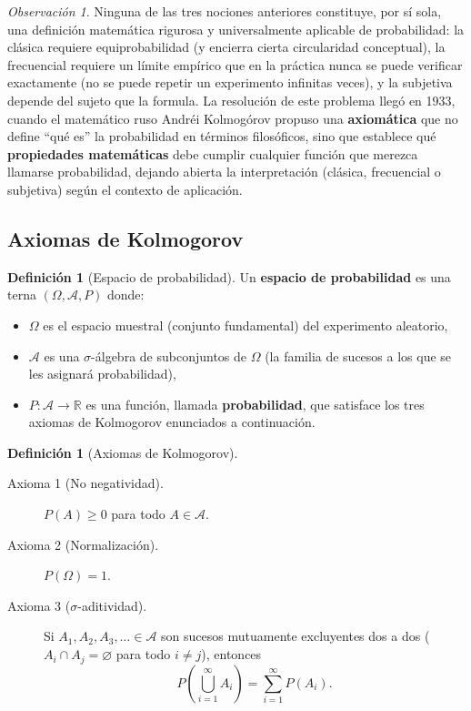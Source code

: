 \documentclass[11pt,a4paper]{article}
\theoremstyle{plain}
\theoremstyle{definition}
\newtheorem{definicion}[teorema]{Definición}
\theoremstyle{remark}
\newtheorem{observacion}[teorema]{Observación}
\begin{document}
\begin{observacion}
Ninguna de las tres nociones anteriores constituye, por sí sola, una definición matemática rigurosa y universalmente aplicable de probabilidad: la clásica requiere equiprobabilidad (y encierra cierta circularidad conceptual), la frecuencial requiere un límite empírico que en la práctica nunca se puede verificar exactamente (no se puede repetir un experimento infinitas veces), y la subjetiva depende del sujeto que la formula. La resolución de este problema llegó en 1933, cuando el matemático ruso Andréi Kolmogórov propuso una \textbf{axiomática} que no define ``qué es'' la probabilidad en términos filosóficos, sino que establece qué \textbf{propiedades matemáticas} debe cumplir cualquier función que merezca llamarse probabilidad, dejando abierta la interpretación (clásica, frecuencial o subjetiva) según el contexto de aplicación.
\end{observacion}

\subsection{Axiomas de Kolmogorov}

\begin{definicion}[Espacio de probabilidad]
Un \textbf{espacio de probabilidad} es una terna $(\Omega, \mathcal{A}, P)$ donde:
\begin{itemize}
\item $\Omega$ es el espacio muestral (conjunto fundamental) del experimento aleatorio,
\item $\mathcal{A}$ es una $\sigma$-álgebra de subconjuntos de $\Omega$ (la familia de sucesos a los que se les asignará probabilidad),
\item $P: \mathcal{A} \to \mathbb{R}$ es una función, llamada \textbf{probabilidad}, que satisface los tres axiomas de Kolmogorov enunciados a continuación.
\end{itemize}
\end{definicion}

\begin{definicion}[Axiomas de Kolmogorov]\leavevmode
\begin{description}
\item[Axioma 1 (No negatividad).] $P(A) \geq 0$ para todo $A \in \mathcal{A}$.
\item[Axioma 2 (Normalización).] $P(\Omega) = 1$.
\item[Axioma 3 ($\sigma$-aditividad).] Si $A_1, A_2, A_3, \dots \in \mathcal{A}$ son sucesos mutuamente excluyentes dos a dos ($A_i \cap A_j = \varnothing$ para todo $i \neq j$), entonces
\[
P\left(\bigcup_{i=1}^{\infty} A_i\right) = \sum_{i=1}^{\infty} P(A_i).
\]
\end{description}
\end{definicion}
\end{document}
